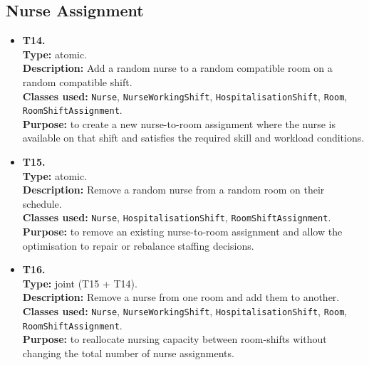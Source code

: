 \documentclass[10pt]{article}
\newcommand{\tlabel}[1]{{\large\bfseries #1}}
\begin{document}
\subsection{Nurse Assignment}
\begin{itemize}
    \item \tlabel{T14.}\\
    \textbf{Type:} atomic.\\
    \textbf{Description:} Add a random nurse to a random compatible room on a random compatible shift.\\
    \textbf{Classes used:} \texttt{Nurse}, \texttt{NurseWorkingShift}, \texttt{HospitalisationShift}, \texttt{Room}, \texttt{RoomShiftAssignment}.\\
    \textbf{Purpose:} to create a new nurse-to-room assignment where the nurse is available on that shift and satisfies the required skill and workload conditions.
    
    \item \tlabel{T15.}\\
    \textbf{Type:} atomic.\\
    \textbf{Description:} Remove a random nurse from a random room on their schedule.\\
    \textbf{Classes used:} \texttt{Nurse}, \texttt{HospitalisationShift}, \texttt{RoomShiftAssignment}.\\
    \textbf{Purpose:} to remove an existing nurse-to-room assignment and allow the optimisation to repair or rebalance staffing decisions.
    
    \item \tlabel{T16.}\\
    \textbf{Type:} joint (T15 + T14).\\
    \textbf{Description:} Remove a nurse from one room and add them to another.\\
    \textbf{Classes used:} \texttt{Nurse}, \texttt{NurseWorkingShift}, \texttt{HospitalisationShift}, \texttt{Room}, \texttt{RoomShiftAssignment}.\\
    \textbf{Purpose:} to reallocate nursing capacity between room-shifts without changing the total number of nurse assignments.
\end{itemize}
\end{document}
